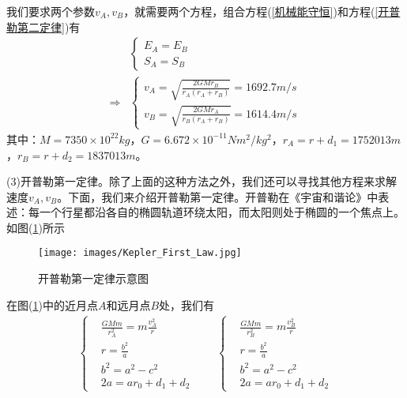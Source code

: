            我们要求两个参数$v_A,v_B$，就需要两个方程，组合方程(\ref{机械能守恒})和方程(\ref{开普勒第二定律})有
            \begin{align*}
            &\left\{
            \begin{aligned}
            E_A = E_B\\
            S_A = S_B
            \end{aligned}
            \right.\\
            \Rightarrow &\left\{
            \begin{aligned}
            v_A = \sqrt{\frac{2GMr_B}{r_A(r_A+r_B)}} = 1692.7m/s\\
            v_B = \sqrt{\frac{2GMr_A}{r_B(r_A+r_B)}} = 1614.4m/s
            \end{aligned}
            \right.
            \end{align*}
            其中：$M = 7350\times 10^{22}kg$，$G=6.672\times 10^{-11}N m^2/kg^2$，$r_A = r+d_1 = 1752013m$，$r_B = r+d_2 = 1837013m$。
            \par
            (3)开普勒第一定律。除了上面的这种方法之外，我们还可以寻找其他方程来求解速度$v_A,v_B$。下面，我们来介绍开普勒第一定律。开普勒在《宇宙和谐论》中表述：每一个行星都沿各自的椭圆轨道环绕太阳，而太阳则处于椭圆的一个焦点上。如图(\ref{fig:开普勒第一定律示意图})所示
            \begin{figure}[H]
            \centering
            \texttt{[image: images/Kepler\_First\_Law.jpg]}
            \caption{开普勒第一定律示意图}
            \label{fig:开普勒第一定律示意图}
            \end{figure}
            \par
            在图(\ref{fig:开普勒第一定律示意图})中的近月点$A$和远月点$B$处，我们有
            \begin{align*}
            \left\{
            \begin{aligned}
            & \frac{GMm}{r_A^2} = m\frac{v_A^2}{r}\\
            & r = \frac{b^2}{a}\\
            & b^2= a^2-c^2\\
            & 2a=ar_0+d_1+d_2
            \end{aligned}
            \right.\qquad
            \left\{
            \begin{aligned}
            & \frac{GMm}{r_B^2} = m\frac{v_B^2}{r}\\
            & r = \frac{b^2}{a}\\
            & b^2= a^2-c^2\\
            & 2a=ar_0+d_1+d_2
            \end{aligned}
            \right.
            \end{align*}
